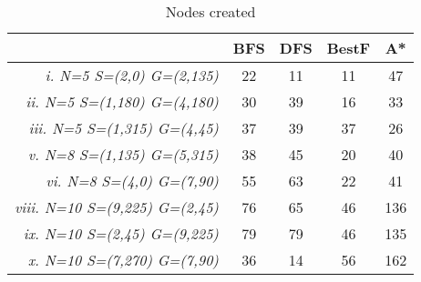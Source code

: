\begin{table}[ht]
\centering
\begin{tabular}{r|c|c|c|c|}
\cline{2-5}
\multicolumn{1}{l|}{} & \textbf{BFS} & \textbf{DFS} & \textbf{BestF} & \textbf{A*} \\ \hline
\multicolumn{1}{|r|}{\textit{i. N=5 S=(2,0) G=(2,135)}} & 22 & 11 & 11 & 47 \\ \hline
\multicolumn{1}{|r|}{\textit{ii. N=5 S=(1,180) G=(4,180)}} & 30 & 39 & 16 & 33 \\ \hline
\multicolumn{1}{|r|}{\textit{iii. N=5 S=(1,315) G=(4,45)}} & 37 & 39 & 37 & 26 \\ \hline
\multicolumn{1}{|r|}{\textit{v. N=8 S=(1,135) G=(5,315)}} & 38 & 45 & 20 & 40 \\ \hline
\multicolumn{1}{|r|}{\textit{vi. N=8 S=(4,0) G=(7,90)}} & 55 & 63 & 22 & 41 \\ \hline
\multicolumn{1}{|r|}{\textit{viii. N=10 S=(9,225) G=(2,45)}} & 76 & 65 & 46 & 136 \\ \hline
\multicolumn{1}{|r|}{\textit{ix. N=10 S=(2,45) G=(9,225)}} & 79 & 79 & 46 & 135 \\ \hline
\multicolumn{1}{|r|}{\textit{x. N=10 S=(7,270) G=(7,90)}} & 36 & 14 & 56 & 162 \\ \hline
\end{tabular}
\caption{Nodes created}
\label{tab:nodes_created}
\end{table}